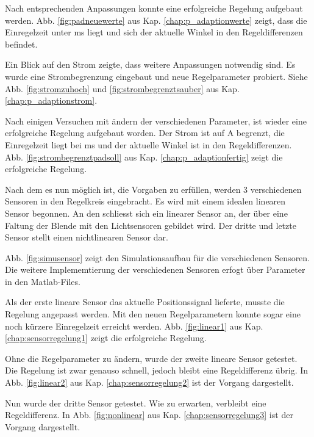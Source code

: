 Nach entsprechenden Anpassungen konnte eine erfolgreiche Regelung aufgebaut werden.
Abb. \ref{fig:padneuewerte} aus Kap. \ref{chap:p_adaptionwerte} zeigt, dass die Einregelzeit unter \unit[1]{ms} liegt und sich der aktuelle Winkel in den Regeldifferenzen 
befindet.

Ein Blick auf den Strom zeigte, dass weitere Anpassungen notwendig sind.
Es wurde eine Strombegrenzung eingebaut und neue Regelparameter probiert.
Siehe Abb. \ref{fig:stromzuhoch} und \ref{fig:strombegrenztsauber} aus Kap. \ref{chap:p_adaptionstrom}.

Nach einigen Versuchen mit ändern der verschiedenen Parameter, ist wieder eine erfolgreiche Regelung aufgebaut worden.
Der Strom ist auf \unit[10]{A} begrenzt, die Einregelzeit liegt bei \unit[1]{ms} und der aktuelle Winkel ist in den Regeldifferenzen.
Abb. \ref{fig:strombegrenztpadsoll} aus Kap. \ref{chap:p_adaptionfertig} zeigt die erfolgreiche Regelung.

Nach dem es nun möglich ist, die Vorgaben zu erfüllen, werden 3 verschiedenen Sensoren in den Regelkreis eingebracht.
Es wird mit einem idealen linearen Sensor begonnen.
An den schliesst sich ein linearer Sensor an, der über eine Faltung der Blende mit den Lichtsensoren gebildet wird.
Der dritte und letzte Sensor stellt einen nichtlinearen Sensor dar.

Abb. \ref{fig:simusensor} zeigt den Simulationsaufbau für die verschiedenen Sensoren.
Die weitere Implememtierung der verschiedenen Sensoren erfogt über Parameter in den Matlab-Files.

Als der erste lineare Sensor das aktuelle Positionssignal lieferte, musste die Regelung angepasst werden.
Mit den neuen Regelparametern konnte sogar eine noch kürzere Einregelzeit erreicht werden.
Abb. \ref{fig:linear1} aus Kap. \ref{chap:sensorregelung1} zeigt die erfolgreiche Regelung.

Ohne die Regelparameter zu ändern, wurde der zweite lineare Sensor getestet.
Die Regelung ist zwar genauso schnell, jedoch bleibt eine Regeldifferenz übrig.
In Abb. \ref{fig:linear2} aus Kap. \ref{chap:sensorregelung2} ist der Vorgang dargestellt.

Nun wurde der dritte Sensor getestet.
Wie zu erwarten, verbleibt eine Regeldifferenz.
In Abb. \ref{fig:nonlinear} aus Kap. \ref{chap:sensorregelung3} ist der Vorgang dargestellt.
